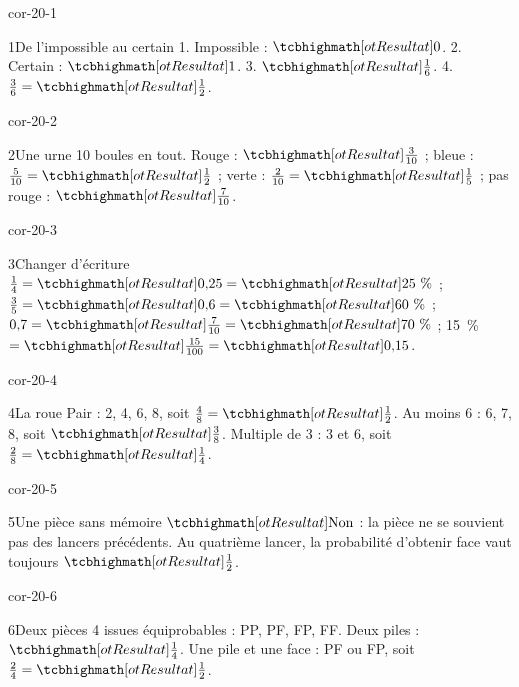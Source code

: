 \clearpage\pagestyle{otMain}\setlength{\otBlocEspacement}{2.5mm}\fontsize{11}{15}\selectfont{}
\begin{blocLivre}{cor-20-1}\begin{corrige}{1}{De l’impossible au certain}
1. Impossible : $\res0$. 2. Certain : $\res1$. 3. $\res{\frac16}$. 4. $\frac36=\res{\frac12}$.
\end{corrige}\end{blocLivre}
\begin{blocLivre}{cor-20-2}\begin{corrige}{2}{Une urne}
10 boules en tout. Rouge : $\res{\frac3{10}}$ ; bleue : $\frac5{10}=\res{\frac12}$ ; verte : $\frac2{10}=\res{\frac15}$ ; pas rouge : $\res{\frac7{10}}$.
\label{fig-cor-20-2}
\end{corrige}\end{blocLivre}
\begin{blocLivre}{cor-20-3}\begin{corrige}{3}{Changer d’écriture}
$\frac14=\res{0{,}25}=\res{25\text{~\%}}$ ; $\frac35=\res{0{,}6}=\res{60\text{~\%}}$ ; $0{,}7=\res{\frac7{10}}=\res{70\text{~\%}}$ ; 15~\% $=\res{\frac{15}{100}}=\res{0{,}15}$.
\end{corrige}\end{blocLivre}
\begin{blocLivre}{cor-20-4}\begin{corrige}{4}{La roue}
Pair : 2, 4, 6, 8, soit $\frac48=\res{\frac12}$. Au moins 6 : 6, 7, 8, soit $\res{\frac38}$. Multiple de 3 : 3 et 6, soit $\frac28=\res{\frac14}$.
\label{fig-cor-20-4}
\end{corrige}\end{blocLivre}
\begin{blocLivre}{cor-20-5}\begin{corrige}{5}{Une pièce sans mémoire}
$\res{\text{Non}}$ : la pièce ne se souvient pas des lancers précédents. Au quatrième lancer, la probabilité d’obtenir face vaut toujours $\res{\frac12}$.
\end{corrige}\end{blocLivre}
\begin{blocLivre}{cor-20-6}\begin{corrige}{6}{Deux pièces}
4 issues équiprobables : PP, PF, FP, FF. Deux piles : $\res{\frac14}$. Une pile et une face : PF ou FP, soit $\frac24=\res{\frac12}$.
\label{fig-cor-20-6}
\end{corrige}\end{blocLivre}

